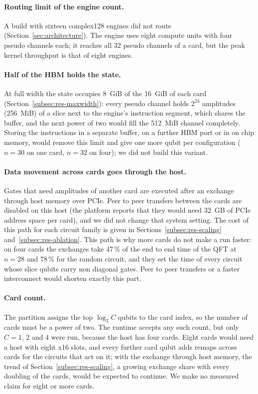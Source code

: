 \documentclass[pdflatex,sn-mathphys-num]{sn-jnl}
\newcommand{\NumScaleExchQftFour}{47}
\newcommand{\NumScaleExchRandFour}{78}
\theoremstyle{thmstyleone}
\theoremstyle{thmstylethree}
\begin{document}
\paragraph{Routing limit of the engine count.} A build with sixteen complex128 engines did not route
(Section~\ref{sec:architecture}). The engine uses eight compute units with four pseudo channels each; it reaches
all 32 pseudo channels of a card, but the peak kernel throughput is that of eight engines.

\paragraph{Half of the HBM holds the state.} At full width the state occupies 8~GiB of the 16~GiB of each card
(Section~\ref{subsec:res-maxwidth}): every pseudo channel holds $2^{24}$ amplitudes (256~MiB) of a slice next to the
engine's instruction segment, which shares the buffer, and the next power of two would fill the 512~MiB channel
completely. Storing the instructions in a separate buffer, on a further HBM port or in on chip memory, would remove this
limit and give one more qubit per configuration ($n=30$ on one card, $n=32$ on four); we did not build this variant.

\paragraph{Data movement across cards goes through the host.} Gates that need amplitudes of another card are
executed after an exchange through host memory over PCIe. Peer to peer transfers between the cards are disabled on
this host (the platform reports that they would need 32~GB of PCIe address space per card), and we did not change that system
setting. The cost of this path for each circuit family is given in
Sections~\ref{subsec:res-scaling} and~\ref{subsec:res-ablation}. This path is why more cards do not make a run faster:
on four cards the exchanges take \NumScaleExchQftFour\,\% of the end to end time of the QFT at $n=28$ and
\NumScaleExchRandFour\,\% for the random circuit, and they set the time of every circuit whose slice qubits carry non
diagonal gates. Peer to peer transfers or a faster interconnect would shorten exactly this part.

\paragraph{Card count.} The partition assigns the top $\log_2 C$ qubits to the card index, so the number of cards
must be a power of two. The runtime accepts any such count, but only $C = 1$, 2 and 4 were run, because the host has
four cards. Eight cards would need a host with eight x16 slots, and every further card qubit adds remaps across cards
for the circuits that act on it; with the exchange through host memory, the trend of Section~\ref{subsec:res-scaling},
a growing exchange share with every doubling of the cards, would be expected to continue. We make no measured claim for
eight or more cards.
\end{document}
